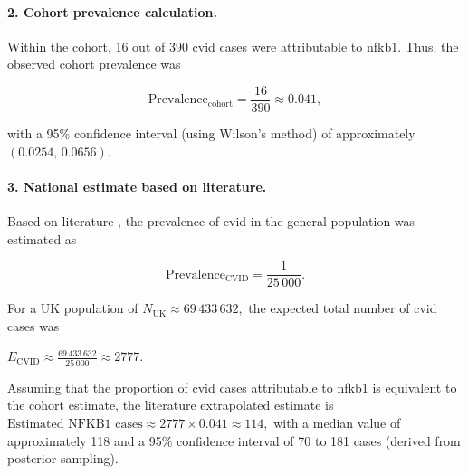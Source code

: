 \paragraph{2. Cohort prevalence calculation.}
Within the cohort, 16 out of 390 \ac{cvid} cases were attributable to \ac{nfkb1}. 
Thus, the observed cohort prevalence was

\[
\text{Prevalence}_{\text{cohort}} = \frac{16}{390} \approx 0.041,
\]

with a 95\% confidence interval (using Wilson's method) of approximately \((0.0254,\,0.0656)\).

\paragraph{3. National estimate based on literature.}
Based on literature
\cite{tuijnenburgNFKB12018, who1997primary, oksenhendler2008infections},
the prevalence of \ac{cvid} in the general population was estimated as

\[
\text{Prevalence}_{\text{CVID}} = \frac{1}{25\,000}.
\]

For a UK population of  $N_{\text{UK}} \approx 69\,433\,632,$
the expected total number of \ac{cvid} cases was

$E_{\text{CVID}} \approx \frac{69\,433\,632}{25\,000} \approx 2777.$

Assuming that the proportion of \ac{cvid} cases attributable to \ac{nfkb1} is equivalent to the cohort estimate, the literature extrapolated estimate is
$
\text{Estimated NFKB1 cases} \approx 2777 \times 0.041 \approx 114,
$
with a median value of approximately 118 and a 95\% confidence interval of 70 to 181 cases (derived from posterior sampling).
%
%  

